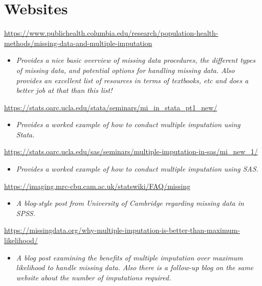 \documentclass[
]{book}
\providecommand{\tightlist}{%
  \setlength{\itemsep}{0pt}\setlength{\parskip}{0pt}}
\begin{document}
\hypertarget{websites-4}{%
\section{Websites}\label{websites-4}}

\url{https://www.publichealth.columbia.edu/research/population-health-methods/missing-data-and-multiple-imputation}

\begin{itemize}
\tightlist
\item
  \emph{Provides a nice basic overview of missing data procedures, the different types of missing data, and potential options for handling missing data. Also provides an excellent list of resources in terms of textbooks, etc and does a better job at that than this list! }
\end{itemize}

\url{https://stats.oarc.ucla.edu/stata/seminars/mi_in_stata_pt1_new/}

\begin{itemize}
\tightlist
\item
  \emph{Provides a worked example of how to conduct multiple imputation using Stata. }
\end{itemize}

\url{https://stats.oarc.ucla.edu/sas/seminars/multiple-imputation-in-sas/mi_new_1/}

\begin{itemize}
\tightlist
\item
  \emph{Provides a worked example of how to conduct multiple imputation using SAS.}
\end{itemize}

\url{https://imaging.mrc-cbu.cam.ac.uk/statswiki/FAQ/missing}

\begin{itemize}
\tightlist
\item
  \emph{A blog-style post from University of Cambridge regarding missing data in SPSS.}
\end{itemize}

\url{https://missingdata.org/why-multiple-imputation-is-better-than-maximum-likelihood/}

\begin{itemize}
\tightlist
\item
  \emph{A blog post examining the benefits of multiple imputation over maximum likelihood to handle missing data. Also there is a follow-up blog on the same website about the number of imputations required. }
\end{itemize}
\end{document}
